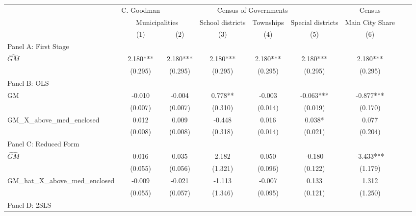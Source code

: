  \begin{tabular}{l*{8}{c}} \toprule
&\multicolumn{1}{c}{C. Goodman}&\multicolumn{4}{c}{Census of Governments}&\multicolumn{1}{c}{Census}\\\cmidrule(lr){2-2}\cmidrule(lr){3-6}\cmidrule(lr){7-7}
&\multicolumn{2}{c}{Municipalities}&\multicolumn{1}{c}{School districts}&\multicolumn{1}{c}{Townships}&\multicolumn{1}{c}{Special districts}&\multicolumn{1}{c}{Main City Share}\\\cmidrule(lr){2-3}\cmidrule(lr){4-6}\cmidrule(lr){7-7}
&\multicolumn{1}{c}{(1)}&\multicolumn{1}{c}{(2)}&\multicolumn{1}{c}{(3)}&\multicolumn{1}{c}{(4)}&\multicolumn{1}{c}{(5)}&\multicolumn{1}{c}{(6)}\\
\cmidrule(lr){1-7}
\multicolumn{6}{l}{Panel A: First Stage}\\
\cmidrule(lr){1-7}
$\widehat{GM}$  &    2.180***&    2.180***&    2.180***&    2.180***&    2.180***&    2.180***\\
                &  (0.295)   &  (0.295)   &  (0.295)   &  (0.295)   &  (0.295)   &  (0.295)   \\
\cmidrule(lr){1-7}
\multicolumn{6}{l}{Panel B: OLS}\\
\cmidrule(lr){1-7}
GM              &   -0.010   &   -0.004   &    0.778** &   -0.003   &   -0.063***&   -0.877***\\
                &  (0.007)   &  (0.007)   &  (0.310)   &  (0.014)   &  (0.019)   &  (0.170)   \\
\addlinespace
GM\_X\_above\_med\_enclosed&    0.012   &    0.009   &   -0.448   &    0.016   &    0.038*  &    0.077   \\
                &  (0.008)   &  (0.008)   &  (0.318)   &  (0.014)   &  (0.021)   &  (0.204)   \\
\cmidrule(lr){1-7}
\multicolumn{6}{l}{Panel C: Reduced Form}\\
\cmidrule(lr){1-7}
$\widehat{GM}$  &    0.016   &    0.035   &    2.182   &    0.050   &   -0.180   &   -3.433***\\
                &  (0.055)   &  (0.056)   &  (1.321)   &  (0.096)   &  (0.122)   &  (1.179)   \\
\addlinespace
GM\_hat\_X\_above\_med\_enclosed&   -0.009   &   -0.021   &   -1.113   &   -0.007   &    0.133   &    1.312   \\
                &  (0.055)   &  (0.057)   &  (1.346)   &  (0.095)   &  (0.121)   &  (1.250)   \\
\cmidrule(lr){1-7}
\multicolumn{6}{l}{Panel D: 2SLS}\\

\end{tabular}
